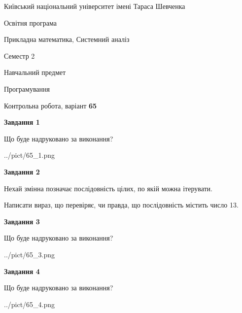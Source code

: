 \documentclass[12pt, ukrainian]{article}
\begin{document}
{{\begin {small}\par
{ \center  Київський національний університет імені Тараса Шевченка \par}
{\parbox {5 cm}{Освітня програма \hfill}{\parbox {8 cm}{Прикладна математика, Системний аналіз \hfill}}\parbox {5 cm}{\hfill Семестр 2}}\par
{\parbox {5 cm} {Навчальний предмет \hfill}\parbox {7 cm}{Програмування \hfill}\parbox {6cm}{\hfill}\par}\vspace{-7pt} \end{small}}{\center Контрольна робота, варіант  \No \textbf
{ 65 }\par}}
{
\begin {large}
{\begin {center}\textbf{Завдання 1}\end {center}}\par
Що буде надруковано за виконання?\par\par
\begin{center}
	{../pict/65_1.png}
\end{center}
\newpage

{\begin {center}\textbf{Завдання 2}\end {center}}\par
Нехай змінна  позначає послідовність цілих, по якій можна ітерувати.

Написати вираз, що перевіряє, чи правда, що послідовність  містить число 13.\par
\newpage

{\begin {center}\textbf{Завдання 3}\end {center}}\par
Що буде надруковано за виконання?\par
\begin{center}
	{../pict/65_3.png}
\end{center}
\newpage

{\begin {center}\textbf{Завдання 4}\end {center}}\par
Що буде надруковано за виконання?\par
\begin{center}
	{../pict/65_4.png}
\end{center}
\newpage


\end{large}}
\end{document}
